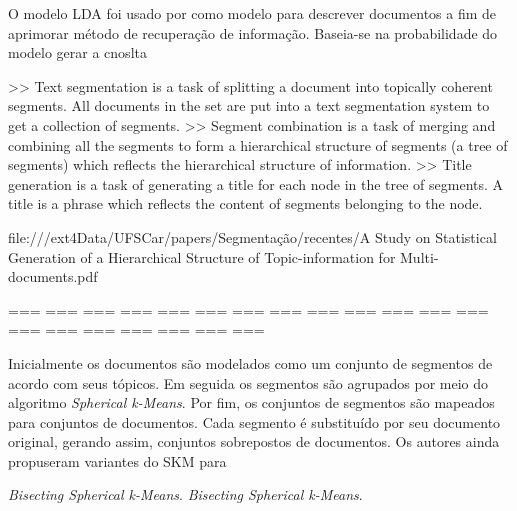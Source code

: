 



O modelo LDA foi usado por \cite{XINGWEI} como modelo para descrever documentos a fim de aprimorar método de recuperação de informação. Baseia-se na probabilidade do modelo gerar a cnoslta

















>> Text segmentation is a task of splitting a document into topically coherent segments.  All documents in the set are put into a text segmentation system to get a collection of segments.
>> Segment combination is a task of merging and combining all the segments to form a hierarchical structure of segments (a tree of segments) which reflects the hierarchical structure of information.
>> Title generation is a task of generating a title for each node in the tree of segments. A title is a phrase which reflects the content of segments belonging to the node.


file:///ext4Data/UFSCar/papers/Segmentação/recentes/A Study on Statistical Generation of a Hierarchical Structure of Topic-information for Multi-documents.pdf
~\cite{NGUYEN Viet Cuong}

=== === === === === === === === === === === === === === === === === === === === 



Inicialmente os documentos são modelados como um conjunto de segmentos de acordo com seus tópicos. Em seguida os segmentos são agrupados por meio do algoritmo \textit{Spherical k-Means}\cite{I. S. Dhillon and D. S. Modha,   Y. Zhao and G. Karypis}. Por fim, os conjuntos de segmentos são mapeados para conjuntos de documentos. Cada segmento é substituído por seu documento original, gerando assim, conjuntos sobrepostos de documentos. Os autores ainda propuseram variantes do SKM para 


\textit{Bisecting Spherical k-Means}\cite{Y. Zhao and G. Karypis}.
\textit{Bisecting Spherical k-Means}\cite{I. S. Dhillon and D. S. Modha,   Y. Zhao and G. Karypis}.

